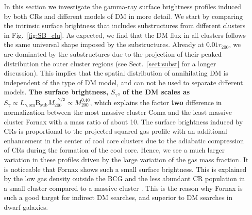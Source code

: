 \documentclass[10pt,aps,pra,reprint,amsmath,amsfonts,amssymb,showpacs,nofootinbib,floatfix]{revtex4-1}
\def\C#1{{\bf #1}}
\newcommand{\rmn}{\mathrm}
\newcommand{\B}{\rmn{B}}
\newcommand{\bsub}{\B_\rmn{sub}}
\newcommand{\rvir}{r_{200}}
\newcommand{\mvir}{M_{200}}
\begin{document}
In this section we investigate the gamma-ray surface brightness
profiles induced by both CRs and different models of DM in more
detail. We start by comparing the intrinsic surface brightness that
includes substructures from different clusters in
Fig.~\ref{fig:SB_clu}. As expected, we find that the DM flux in all
clusters follows the same universal shape imposed by the
substructures. Already at $0.01\rvir$, we are dominated by the
substructures due to the projection of their peaked distribution the
outer cluster regions (see Sect.~\ref{sect:subst} for a longer
discussion). This implies that the spatial distribution of
annihilating DM is independent of the type of DM model, and can not be
used to separate different models. \C{The surface brightness, $S_\gamma$,
of the DM scales as $S_\gamma\propto L_{\gamma,\rmn{sm}}\bsub\mvir^{-2/3}
\propto \mvir^{0.40}$}, which explains the factor \C{two} difference in
normalization between the most massive cluster Coma and the least
massive cluster Fornax with a mass ratio of about 10. The surface
brightness induced by CRs is proportional to the projected squared gas
profile with an additional enhancement in the center of cool core
clusters due to the adiabatic compression of CRs during the formation
of the cool core. Hence, we see a much larger variation in these
profiles driven by the large variation of the gas mass fraction. It is
noticeable that Fornax shows such a small surface brightness. This is
explained by the low gas density outside the BCG and the less abundant
CR population in a small cluster compared to a massive cluster
\cite{2010MNRAS.409..449P}.  This is the reason why Fornax is such a
good target for indirect DM searches, and superior to DM searches in
dwarf galaxies.
\end{document}
